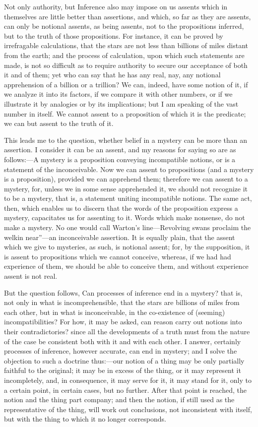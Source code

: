 Not only authority, but Inference also may impose on us assents
which in themselves are little better than assertions, and which, so
far as they are assents, can only be notional assents, as being
assents, not to the propositions inferred, but to the truth of those
propositions. For instance, it can be proved by irrefragable
calculations, that the stars are not less than billions of miles
distant from the earth; and the process of calculation, upon which
such statements are made, is not so difficult as to require authority
to secure our acceptance of both it and of them; yet who can say that
he has any real, nay, any notional apprehension of a billion or a
trillion? We can, indeed, have some notion of it, if we analyze it
into its factors, if we compare it with other numbers, or if we
illustrate it by analogies or by its implications; but I am speaking
of the vast number in itself. We cannot assent to a proposition of
which it is the predicate; we can but assent to the truth of it.

This leads me to the question, whether belief in a mystery can be
more than an assertion. I consider it can be an assent, and my reasons
for saying so are as follows:—A mystery is a proposition conveying
incompatible notions, or is a statement of the inconceivable. Now we
can assent to propositions (and a mystery is a proposition),
provided we can apprehend them; therefore we can assent to a mystery,
for, unless we in some sense apprehended it, we should not recognize
it to be a mystery, that is, a statement uniting incompatible notions.
The same act, then, which enables us to discern that the words of the
proposition express a mystery, capacitates us for assenting to it.
Words which make nonsense, do not make a mystery. No one would call
Warton's line—Revolving swans proclaim the welkin near''—an
inconceivable assertion. It is equally plain, that the assent which we
give to mysteries, as such, is notional assent; for, by the
supposition, it is assent to propositions which we cannot conceive,
whereas, if we had had experience of them, we should be able to
conceive them, and without experience assent is not real.

But the question follows, Can processes of inference end in a
mystery? that is, not only in what is incomprehensible, that the stars
are billions of miles from each other, but in what is inconceivable,
in the co-existence of (seeming) incompatibilities? For how, it may be
asked, can reason carry out notions into their contradictories? since
all the developments of a truth must from the nature of the case be
consistent both with it and with each other. I answer, certainly
processes of inference, however accurate, can end in mystery; and I
solve the objection to such a doctrine thus:—our notion of a thing
may be only partially faithful to the original; it may be in excess of
the thing, or it may represent it incompletely, and, in consequence,
it may serve for it, it may stand for it, only to a certain point, in
certain cases, but no further. After that point is reached, the notion and the thing part company; and then the notion, if still used
as the representative of the thing, will work out conclusions, not
inconsistent with itself, but with the thing to which it no longer
corresponds.

